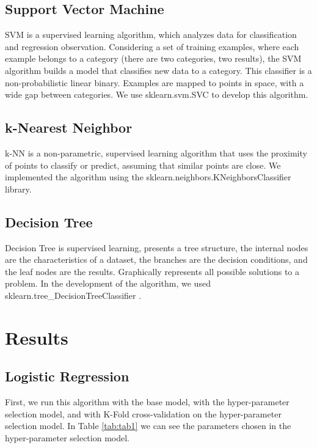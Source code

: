 \documentclass[conference]{IEEEtran}
\begin{document}
\subsection{Support Vector Machine}
SVM \cite{svm-def} is a supervised learning algorithm, which analyzes data for classification and regression observation. Considering a set of training examples, where each example belongs to a category (there are two categories, two results), the SVM algorithm builds a model that classifies new data to a category. This classifier is a non-probabilistic linear binary. Examples are mapped to points in space, with a wide gap between categories. We use sklearn.svm.SVC \cite{svm} to develop this algorithm.

\subsection{k-Nearest Neighbor}
k-NN \cite{knn-def} is a non-parametric, supervised learning algorithm that uses the proximity of points to classify or predict, assuming that similar points are close. We implemented the algorithm using the sklearn.neighbors.KNeighborsClassifier \cite{knn} library.

\subsection{Decision Tree}
Decision Tree \cite{tree-def} is supervised learning, presents a tree structure, the internal nodes are the characteristics of a dataset, the branches are the decision conditions, and the leaf nodes are the results. Graphically represents all possible solutions to a problem. In the development of the algorithm, we used sklearn.tree\_DecisionTreeClassifier \cite{tree}.

\section{Results}

\subsection{Logistic Regression}

First, we run this algorithm with the base model, with the hyper-parameter selection model, and with K-Fold cross-validation on the hyper-parameter selection model. In Table \ref{tab:tab1} we can see the parameters chosen in the hyper-parameter selection model.
\end{document}
